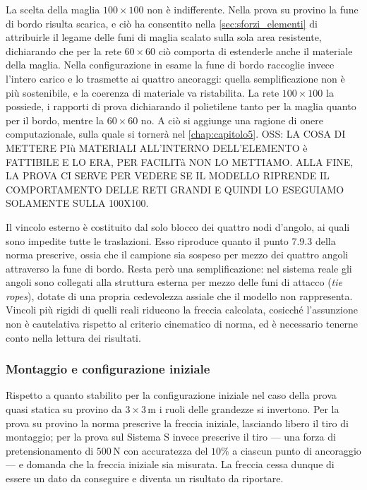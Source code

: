 La scelta della maglia $100\times100$ non è indifferente. Nella prova su provino la fune di bordo risulta scarica, e ciò ha consentito nella \cref{sec:sforzi_elementi} di attribuirle il legame delle funi di maglia scalato sulla sola area resistente, dichiarando che per la rete $60\times60$ ciò comporta di estenderle anche il materiale della maglia. Nella configurazione in esame la fune di bordo raccoglie invece l'intero carico e lo trasmette ai quattro ancoraggi: quella semplificazione non è più sostenibile, e la coerenza di materiale va ristabilita. La rete $100\times100$ la possiede, i rapporti di prova dichiarando il polietilene tanto per la maglia quanto per il bordo, mentre la $60\times60$ no. A ciò si aggiunge una ragione di onere computazionale, sulla quale si tornerà nel \cref{chap:capitolo5}. OSS: LA COSA DI METTERE PIù MATERIALI ALL'INTERNO DELL'ELEMENTO è FATTIBILE E LO ERA, PER FACILITà NON LO METTIAMO. ALLA FINE, LA PROVA CI SERVE PER VEDERE SE IL MODELLO RIPRENDE IL COMPORTAMENTO DELLE RETI GRANDI E QUINDI LO ESEGUIAMO SOLAMENTE SULLA 100X100.

Il vincolo esterno è costituito dal solo blocco dei quattro nodi d'angolo, ai quali sono impedite tutte le traslazioni. Esso riproduce quanto il punto 7.9.3 della norma prescrive, ossia che il campione sia sospeso per mezzo dei quattro angoli attraverso la fune di bordo. Resta però una semplificazione: nel sistema reale gli angoli sono collegati alla struttura esterna per mezzo delle funi di attacco (\textit{tie ropes}), dotate di una propria cedevolezza assiale che il modello non rappresenta. Vincoli più rigidi di quelli reali riducono la freccia calcolata, cosicché l'assunzione non è cautelativa rispetto al criterio cinematico di norma, ed è necessario tenerne conto nella lettura dei risultati.  

\subsubsection{Montaggio e configurazione iniziale}
\label{sec:montaggio_5x7}

Rispetto a quanto stabilito per la configurazione iniziale nel caso della prova quasi statica su provino da $3\times3\,\text{m}$ i ruoli delle grandezze si invertono. Per la prova su provino la norma prescrive la freccia iniziale, lasciando libero il tiro di montaggio; per la prova sul Sistema S invece prescrive il tiro — una forza di pretensionamento di $500\,\text{N}$ con accuratezza del $10\%$ a ciascun punto di ancoraggio — e domanda che la freccia iniziale sia misurata. La freccia cessa dunque di essere un dato da conseguire e diventa un risultato da riportare. 

